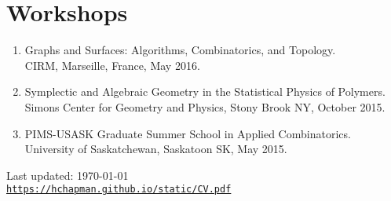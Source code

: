 \documentclass[letterpaper]{article}
\def\footerlink{https://hchapman.github.io/static/CV.pdf}
\begin{document}
\section*{Workshops}
\begin{enumerate}
\item Graphs and Surfaces: Algorithms, Combinatorics, and Topology. \\
  CIRM, Marseille, France, May 2016.
\item Symplectic and Algebraic Geometry in the Statistical Physics of Polymers. \\
  Simons Center for Geometry and Physics, Stony Brook NY, October 2015. 
\item PIMS-USASK Graduate Summer School in Applied Combinatorics. \\
  University of Saskatchewan, Saskatoon SK, May 2015.
\end{enumerate}

\bigskip

\begin{center}
  \begin{footnotesize}
    Last updated: \today \\
    \href{\footerlink}{\texttt{\footerlink}}
  \end{footnotesize}
\end{center}
\end{document}
